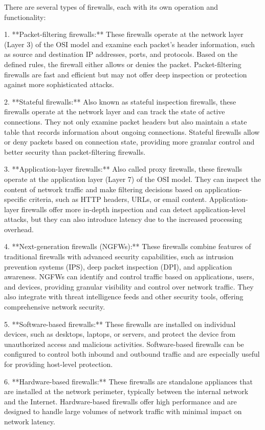 \documentclass{article}
\begin{document}
There are several types of firewalls, each with its own operation and functionality:

1. **Packet-filtering firewalls:** These firewalls operate at the network layer (Layer 3) of the OSI model and examine each packet's header information, such as source and destination IP addresses, ports, and protocols. Based on the defined rules, the firewall either allows or denies the packet. Packet-filtering firewalls are fast and efficient but may not offer deep inspection or protection against more sophisticated attacks.

2. **Stateful firewalls:** Also known as stateful inspection firewalls, these firewalls operate at the network layer and can track the state of active connections. They not only examine packet headers but also maintain a state table that records information about ongoing connections. Stateful firewalls allow or deny packets based on connection state, providing more granular control and better security than packet-filtering firewalls.

3. **Application-layer firewalls:** Also called proxy firewalls, these firewalls operate at the application layer (Layer 7) of the OSI model. They can inspect the content of network traffic and make filtering decisions based on application-specific criteria, such as HTTP headers, URLs, or email content. Application-layer firewalls offer more in-depth inspection and can detect application-level attacks, but they can also introduce latency due to the increased processing overhead.

4. **Next-generation firewalls (NGFWs):** These firewalls combine features of traditional firewalls with advanced security capabilities, such as intrusion prevention systems (IPS), deep packet inspection (DPI), and application awareness. NGFWs can identify and control traffic based on applications, users, and devices, providing granular visibility and control over network traffic. They also integrate with threat intelligence feeds and other security tools, offering comprehensive network security.

5. **Software-based firewalls:** These firewalls are installed on individual devices, such as desktops, laptops, or servers, and protect the device from unauthorized access and malicious activities. Software-based firewalls can be configured to control both inbound and outbound traffic and are especially useful for providing host-level protection.

6. **Hardware-based firewalls:** These firewalls are standalone appliances that are installed at the network perimeter, typically between the internal network and the Internet. Hardware-based firewalls offer high performance and are designed to handle large volumes of network traffic with minimal impact on network latency.
\end{document}
